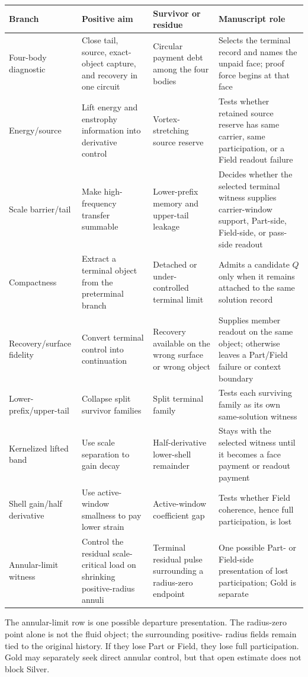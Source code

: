\begin{center}
\small
\begin{tabular}{L{0.16\textwidth} L{0.23\textwidth} L{0.23\textwidth} L{0.24\textwidth}}
\hline
\textbf{Branch} & \textbf{Positive aim} & \textbf{Survivor or residue} & \textbf{Manuscript role}\\
\hline
Four-body diagnostic & Close tail, source, exact-object capture, and recovery in one circuit & Circular payment debt among the four bodies & Selects the terminal record and names the unpaid face; proof force begins at that face\\
Energy/source & Lift energy and enstrophy information into derivative control & Vortex-stretching source reserve & Tests whether retained source reserve has same carrier, same participation, or a Field readout failure\\
Scale barrier/tail & Make high-frequency transfer summable & Lower-prefix memory and upper-tail leakage & Decides whether the selected terminal witness supplies carrier-window support, Part-side, Field-side, or pass-side readout\\
Compactness & Extract a terminal object from the preterminal branch & Detached or under-controlled terminal limit & Admits a candidate \(Q\) only when it remains attached to the same solution record\\
Recovery/surface fidelity & Convert terminal control into continuation & Recovery available on the wrong surface or wrong object & Supplies member readout on the same object; otherwise leaves a Part/Field failure or context boundary\\
Lower-prefix/upper-tail & Collapse split survivor families & Split terminal family & Tests each surviving family as its own same-solution witness\\
Kernelized lifted band & Use scale separation to gain decay & Half-derivative lower-shell remainder & Stays with the selected witness until it becomes a face payment or readout payment\\
Shell gain/half derivative & Use active-window smallness to pay lower strain & Active-window coefficient gap & Tests whether Field coherence, hence full participation, is lost\\
Annular-limit witness & Control the residual scale-critical load on shrinking positive-radius annuli & Terminal residual pulse surrounding a radius-zero endpoint & One possible Part- or Field-side presentation of lost participation; Gold is separate\\
\hline
\end{tabular}
\end{center}

The annular-limit row is one possible departure presentation.  The
radius-zero point alone is not the fluid object; the surrounding positive-
radius fields remain tied to the original history.  If they lose Part or
Field, they lose full participation.  Gold may separately seek direct annular
control, but that open estimate does not block Silver.
